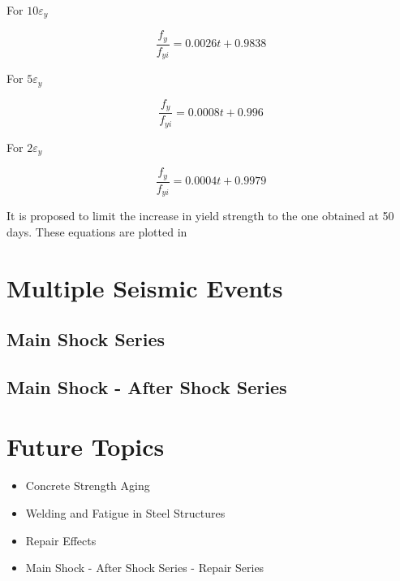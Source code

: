 For $10\varepsilon_y$

\begin{equation}
  \frac{f_y}{f_{yi}}=0.0026t+0.9838
  \label{eq.twelve}
\end{equation} 

For $5\varepsilon_y$

\begin{equation}
  \frac{f_y}{f_{yi}}=0.0008t+0.996
  \label{eq.thirteen}
\end{equation} 

For $2\varepsilon_y$

\begin{equation}
  \frac{f_y}{f_{yi}}=0.0004t+0.9979
  \label{eq.fourteen}
\end{equation} 

It is proposed to limit the increase in yield strength to the one obtained at 50 days. These equations are plotted in 


\section{Multiple Seismic Events}

\subsection{Main Shock Series}

\subsection{Main Shock - After Shock Series}

\section{Future Topics}

\begin{itemize}
	\item Concrete Strength Aging
	\item Welding and Fatigue in Steel Structures
	\item Repair Effects
	\item Main Shock - After Shock Series - Repair Series
\end{itemize}
